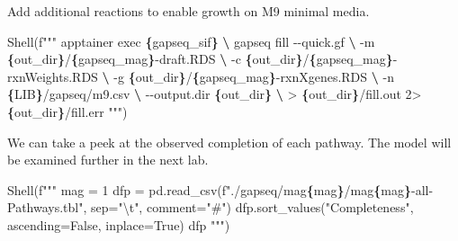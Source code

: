 \documentclass[
]{book}
\newenvironment{Shaded}{\begin{snugshade}}{\end{snugshade}}
\newcommand{\CharTok}[1]{\textcolor[rgb]{0.31,0.60,0.02}{#1}}
\newcommand{\NormalTok}[1]{#1}
\newcommand{\OperatorTok}[1]{\textcolor[rgb]{0.81,0.36,0.00}{\textbf{#1}}}
\newcommand{\SpecialCharTok}[1]{\textcolor[rgb]{0.81,0.36,0.00}{\textbf{#1}}}
\newcommand{\SpecialStringTok}[1]{\textcolor[rgb]{0.31,0.60,0.02}{#1}}
\begin{document}
Add additional reactions to enable growth on M9 minimal media.

\begin{Shaded}
\begin{Highlighting}[numbers=left,,]
\NormalTok{Shell(}\SpecialStringTok{f"""}
\SpecialStringTok{apptainer exec }\SpecialCharTok{\{}\NormalTok{gapseq\_sif}\SpecialCharTok{\}}\SpecialStringTok{ }\OperatorTok{\textbackslash{}}
\SpecialStringTok{    gapseq fill {-}{-}quick.gf }\OperatorTok{\textbackslash{}}
\SpecialStringTok{        {-}m }\SpecialCharTok{\{}\NormalTok{out\_dir}\SpecialCharTok{\}}\SpecialStringTok{/}\SpecialCharTok{\{}\NormalTok{gapseq\_mag}\SpecialCharTok{\}}\SpecialStringTok{{-}draft.RDS }\OperatorTok{\textbackslash{}}
\SpecialStringTok{        {-}c }\SpecialCharTok{\{}\NormalTok{out\_dir}\SpecialCharTok{\}}\SpecialStringTok{/}\SpecialCharTok{\{}\NormalTok{gapseq\_mag}\SpecialCharTok{\}}\SpecialStringTok{{-}rxnWeights.RDS }\OperatorTok{\textbackslash{}}
\SpecialStringTok{        {-}g }\SpecialCharTok{\{}\NormalTok{out\_dir}\SpecialCharTok{\}}\SpecialStringTok{/}\SpecialCharTok{\{}\NormalTok{gapseq\_mag}\SpecialCharTok{\}}\SpecialStringTok{{-}rxnXgenes.RDS }\OperatorTok{\textbackslash{}}
\SpecialStringTok{        {-}n }\SpecialCharTok{\{}\NormalTok{LIB}\SpecialCharTok{\}}\SpecialStringTok{/gapseq/m9.csv }\OperatorTok{\textbackslash{}}
\SpecialStringTok{        {-}{-}output.dir }\SpecialCharTok{\{}\NormalTok{out\_dir}\SpecialCharTok{\}}\SpecialStringTok{ }\OperatorTok{\textbackslash{}}
\SpecialStringTok{        \textgreater{} }\SpecialCharTok{\{}\NormalTok{out\_dir}\SpecialCharTok{\}}\SpecialStringTok{/fill.out 2\textgreater{} }\SpecialCharTok{\{}\NormalTok{out\_dir}\SpecialCharTok{\}}\SpecialStringTok{/fill.err}
\SpecialStringTok{"""}\NormalTok{)}
\end{Highlighting}
\end{Shaded}

We can take a peek at the observed completion of each pathway.
The model will be examined further in the next lab.

\begin{Shaded}
\begin{Highlighting}[numbers=left,,]
\NormalTok{Shell(}\SpecialStringTok{f"""}
\SpecialStringTok{mag = 1}
\SpecialStringTok{dfp = pd.read\_csv(f"./gapseq/mag}\SpecialCharTok{\{}\NormalTok{mag}\SpecialCharTok{\}}\SpecialStringTok{/mag}\SpecialCharTok{\{}\NormalTok{mag}\SpecialCharTok{\}}\SpecialStringTok{{-}all{-}Pathways.tbl", sep="}\CharTok{\textbackslash{}t}\SpecialStringTok{", comment="\#")}
\SpecialStringTok{dfp.sort\_values("Completeness", ascending=False, inplace=True)}
\SpecialStringTok{dfp}
\SpecialStringTok{"""}\NormalTok{)}
\end{Highlighting}
\end{Shaded}
\end{document}
